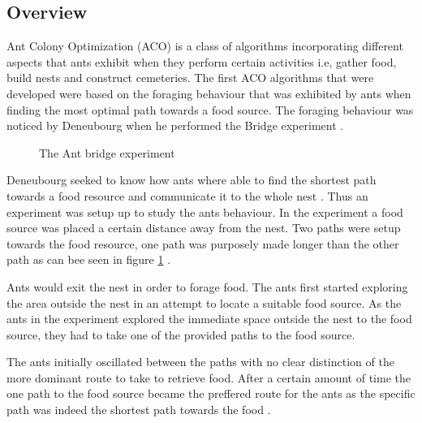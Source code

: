 \subsection{Overview}
\label{sec:ACOverview}
Ant Colony Optimization (ACO) is a class of algorithms incorporating different aspects that ants exhibit when they perform certain activities i.e, gather food, build nests and construct cemeteries. The first ACO algorithms that were developed were based on the foraging behaviour that was exhibited by ants when finding the most optimal path towards a food source. The foraging behaviour was noticed by Deneubourg when he performed the Bridge experiment \cite{AntsAndStigmergy,CompuIntelligenceIntro}.
\begin{figure}[b!]
	\centering
	\setlength \fboxsep{0pt}
	\setlength \fboxrule{0.5pt}
	\caption{The Ant bridge experiment \cite{AntsAndStigmergy}}
	\label{fig:antBridgeExperiment}
\end{figure}

Deneubourg seeked to know how ants where able to find the shortest path towards a food resource and communicate it to the whole nest \cite{AntsAndStigmergy}. Thus an experiment was setup up to study the ants behaviour. In the experiment a food source was placed a certain distance away from the nest. Two paths were setup towards the food resource, one path was purposely made longer than the other path as can bee seen in figure \ref{fig:antBridgeExperiment} \cite{AntsAndStigmergy}.

Ants would exit the nest in order to forage food. The ants first started exploring the area outside the nest in an attempt to locate a suitable food source. As the ants in the experiment explored the immediate space outside the nest to the food source, they had to take one of the provided paths to the food source\cite{AntsAndStigmergy}.

The ants initially oscillated between the paths with no clear distinction of the more dominant route to take to retrieve food. After a certain amount of time the one path to the food source became the preffered route for the ants as the specific path was indeed the shortest path towards the food \cite{AntsAndStigmergy}.

